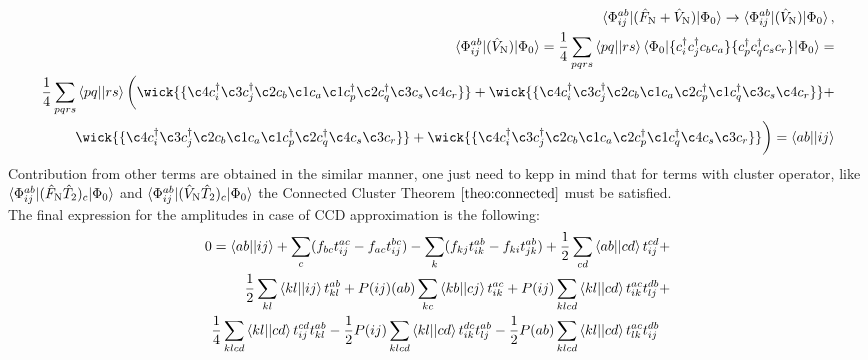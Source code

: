 \documentclass[twoside,english]{uiofysmaster}
\theoremstyle{definition}
\begin{document}
\begin{eqnarray}
\braket{\Phi_{ij}^{ab}|(\hat{F}_\text{N}+\hat{V}_\text{N})|\Phi_0} \rightarrow \braket{\Phi_{ij}^{ab}|(\hat{V}_\text{N})|\Phi_0},\nonumber \\
\braket{\Phi_{ij}^{ab}|(\hat{V}_\text{N})|\Phi_0} = \frac{1}{4}\sum_{pqrs} \braket{pq||rs}\braket{\Phi_0| \{  c_i^\dagger c_j^\dagger  c_b  c_a \} \{  c_p^\dagger c_q^\dagger  c_s  c_r \} |\Phi_0}=\nonumber \\
 \frac{1}{4}\sum_{pqrs} \braket{pq||rs} \bigg( \wick{ \{ \c4 c_i^\dagger \c3 c_j^\dagger \c2 c_b \c1 c_a \c1  c_p^\dagger \c2 c_q^\dagger \c3 c_s \c4 c_r \}  } 
 + \wick{ \{ \c4 c_i^\dagger \c3 c_j^\dagger \c2 c_b \c1 c_a \c2  c_p^\dagger \c1 c_q^\dagger \c3 c_s \c4 c_r \}  } + \nonumber \\
  \wick{ \{ \c4 c_i^\dagger \c3 c_j^\dagger \c2 c_b \c1 c_a \c1  c_p^\dagger \c2 c_q^\dagger \c4 c_s \c3 c_r \}  }+\wick{ \{ \c4 c_i^\dagger \c3 c_j^\dagger \c2 c_b \c1 c_a \c2  c_p^\dagger \c1 c_q^\dagger \c4 c_s \c3 c_r \}  }  \bigg) =\braket{ab||ij}
\end{eqnarray}
Contribution from other terms are obtained in the similar manner, one just need to kepp in mind that for terms with cluster operator, like $\braket{\Phi_{ij}^{ab}|(\hat{F}_\text{N}\hat{T}_2)_c|\Phi_0}$ and $\braket{\Phi_{ij}^{ab}|(\hat{V}_\text{N}\hat{T}_2)_c|\Phi_0}$ the Connected Cluster Theorem $\ref{theo:connected}$ must be satisfied.\\
The final expression for the amplitudes in case of CCD approximation is the following:
\begin{eqnarray}\label{eq:CCD_ampl}
0 =\braket{ab||ij} + \sum_{c}(f_{bc}t_{ij}^{ac}-f_{ac}t_{ij}^{bc} ) - \sum_{k}(f_{kj}t_{ik}^{ab}-f_{ki}t_{jk}^{ab} ) +\frac{1}{2} \sum_{cd}\braket{ab||cd}t_{ij}^{cd} 
\nonumber &+\\
 \frac{1}{2} \sum_{kl}\braket{kl||ij}t_{kl}^{ab}  + P(ij)(ab)  \sum_{kc}\braket{kb||cj}t_{ik}^{ac} + 
  P(ij) \sum_{klcd}\braket{kl||cd}t_{ik}^{ac} t_{lj}^{db} \nonumber & + \\
 \frac{1}{4} \sum_{klcd}\braket{kl||cd}t_{ij}^{cd} t_{kl}^{ab}  
- \frac{1}{2} P(ij) \sum_{klcd}\braket{kl||cd}t_{ik}^{dc}t_{lj}^{ab}- \frac{1}{2} P(ab) \sum_{klcd}\braket{kl||cd}t_{lk}^{ac}t_{ij}^{db}&  
\end{eqnarray}
\end{document}
